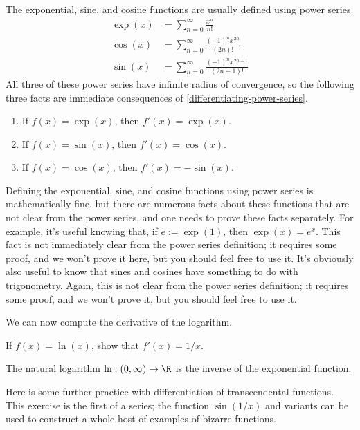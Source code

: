The exponential, sine, and cosine functions are usually defined using power series. 
\[ \begin{aligned} \exp(x) &= \sum_{n = 0}^\infty \frac{x^n}{n!} \\
\cos(x) &= \sum_{n = 0}^\infty \frac{(-1)^n x^{2n}}{(2n)!} \\
\sin(x) &= \sum_{n = 0}^\infty \frac{(-1)^n x^{2n+1}}{(2n+1)!} \end{aligned} \]
All three of these power series have infinite radius of convergence, so the following three facts are immediate consequences of \cref{differentiating-power-series}. 
\begin{enumerate}[(1)]
	\item If $f(x) = \exp(x)$, then $f'(x) = \exp(x)$. 
	\item If $f(x) = \sin(x)$, then $f'(x) = \cos(x)$. 
	\item If $f(x) = \cos(x)$, then $f'(x) = -\sin(x)$.
\end{enumerate} 

\begin{remark}
	Defining the exponential, sine, and cosine functions using power series is mathematically fine, but there are numerous facts about these functions that are not clear from the power series, and one needs to prove these facts separately. For example, it's useful knowing that, if $e := \exp(1)$, then $\exp(x) = e^x$. This fact is not immediately clear from the power series definition; it requires some proof, and we won't prove it here, but you should feel free to use it. It's obviously also useful to know that sines and cosines have something to do with trigonometry. Again, this is not clear from the power series definition; it requires some proof, and we won't prove it, but you should feel free to use it. 
\end{remark}

We can now compute the derivative of the logarithm.

\begin{exercise}
	If $f(x) = \ln(x)$, show that $f'(x) = 1/x$. 
	\begin{hint} The natural logarithm $\ln : (0, \infty) \to \R$ is the inverse of the exponential function. \end{hint}
\end{exercise}

Here is some further practice with differentiation of transcendental functions. This exercise is the first of a series; the function $\sin(1/x)$ and variants can be used to construct a whole host of examples of bizarre functions. 

